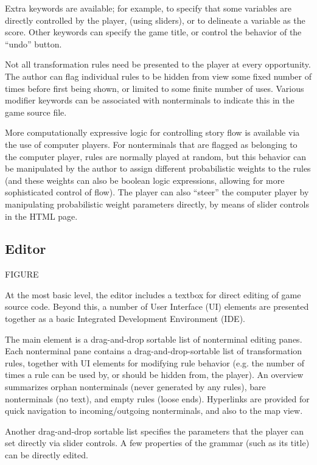 \documentclass{acm_proc_article-sp}
\begin{document}
Extra keywords are available; for example, to specify that some variables are directly controlled by the player,
(using sliders), or to delineate a variable as the score.
Other keywords can specify the game title, or control the behavior of the ``undo'' button.

Not all transformation rules need be presented to the player at every opportunity.
The author can flag individual rules to be hidden from view some fixed number of times
before first being shown, or limited to some finite number of uses.
Various modifier keywords can be associated with nonterminals to indicate this in the game source file.

More computationally expressive logic for controlling story flow is available via the use of computer players.
For nonterminals that are flagged as belonging to the computer player,
rules are normally played at random,
but this behavior can be manipulated by the author to
assign different probabilistic weights to the rules
(and these weights can also be boolean logic expressions, allowing for more sophisticated control of flow).
The player can also ``steer'' the computer player by manipulating probabilistic weight parameters directly,
by means of slider controls in the HTML page.

\subsection{Editor}

FIGURE

At the most basic level, the editor includes a textbox for direct editing of game source code.
Beyond this, a number of User Interface (UI)
elements are presented together as a basic Integrated Development Environment (IDE).

The main element is a drag-and-drop sortable list of nonterminal editing panes.
Each nonterminal pane contains a drag-and-drop-sortable list of transformation rules,
together with UI elements for modifying rule behavior (e.g. the number of times
a rule can be used by, or should be hidden from, the player).
An overview summarizes orphan nonterminals (never generated by any rules),
bare nonterminals (no text), and empty rules (loose ends).
Hyperlinks are provided for quick navigation to incoming/outgoing nonterminals,
and also to the map view.

Another drag-and-drop sortable list specifies the parameters that the player
can set directly via slider controls.
A few properties of the grammar (such as its title) can be directly edited.
\end{document}

